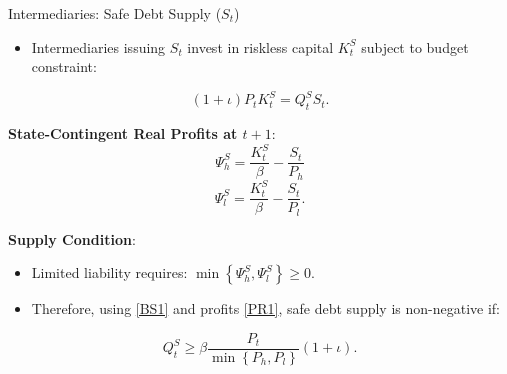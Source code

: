 \documentclass[11pt,aspectratio=169]{beamer}
\begin{document}
\begin{frame}{Intermediaries: Safe Debt Supply ($S_t$)}
\small
\begin{itemize}
    \item Intermediaries issuing $S_{t}$ invest in riskless capital $K_{t}^{S}$ subject to budget constraint:
\end{itemize}

\begin{equation}
(1+\iota )P_{t}K_{t}^{S}=Q_{t}^{S}S_{t}. \label{BS1}
\end{equation}

\textbf{State-Contingent Real Profits at $t+1$}:
\begin{equation}
\Psi _{h}^{S}=\frac{K_{t}^{S}}{\beta }-\frac{S_{t}}{P_{h}} \label{PR2}
\end{equation}
\begin{equation}
\Psi _{l}^{S}=\frac{K_{t}^{S}}{\beta }-\frac{S_{t}}{P_{l}}. \label{PR1}
\end{equation}

\textbf{Supply Condition}:
\begin{itemize}
    \item Limited liability requires: $\min \left\{ \Psi _{h}^{S},\Psi _{l}^{S}\right\} \geq 0$. \label{PR3}
    \item Therefore, using \eqref{BS1} and profits \eqref{PR1}, safe debt supply is non-negative if:
\end{itemize}
\begin{equation}
Q_{t}^{S}\geq \beta \frac{P_{t}}{\min \left\{ P_{h},P_{l}\right\} }(1+\iota). \label{QSoptIntermediaries}
\end{equation}
\end{frame}
\end{document}
